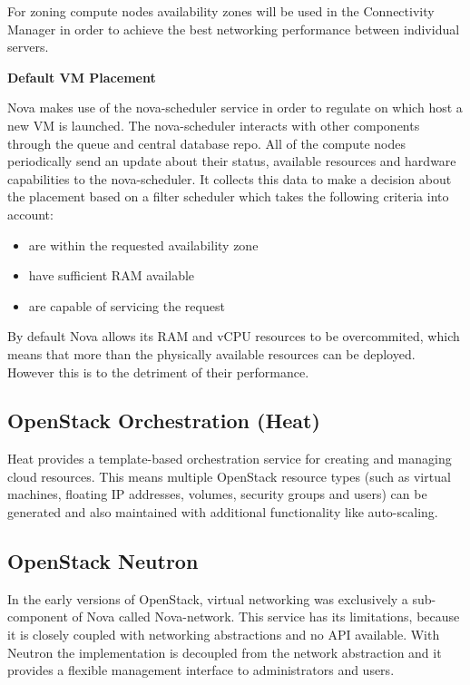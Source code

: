 For zoning compute nodes availability zones will be used in the Connectivity Manager in order to achieve the best networking performance between individual servers.

\textbf{Default VM Placement}

Nova makes use of the nova-scheduler service in order to regulate on which host a new VM is launched. The nova-scheduler interacts with other components through the queue and central database repo. All of the compute nodes periodically send an update about their status,  available resources and hardware capabilities to the nova-scheduler. It collects this data to make a decision about the placement based on a filter scheduler which takes the following criteria into account:
\begin{itemize}
\item are within the requested availability zone
\item have sufficient RAM available
\item are capable of servicing the request
\end{itemize}
By default Nova allows its RAM and vCPU resources to be overcommited, which means that more than the physically available resources can be deployed. However this is to the detriment of their performance.

\subsection{OpenStack Orchestration (Heat)}

Heat provides a template-based orchestration service for creating and managing cloud resources. This means multiple OpenStack resource types (such as virtual machines, floating IP addresses, volumes, security groups and users) can be generated and also maintained with additional functionality like auto-scaling.


\subsection{OpenStack Neutron}

In the early versions of OpenStack, virtual networking was exclusively a sub-component of Nova called Nova-network. This service has its limitations, because it is closely coupled with networking abstractions and no API available. With Neutron the implementation is decoupled from the network abstraction and it provides a flexible management interface to administrators and users.



